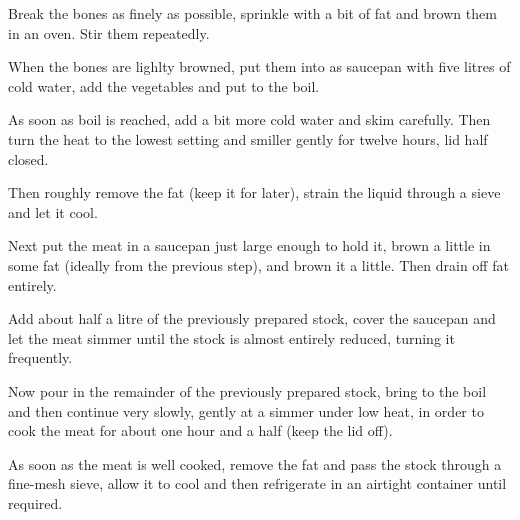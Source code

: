 \begin{method}
     	Break the bones as finely as possible, sprinkle with a bit of fat and brown them in an oven.  Stir them repeatedly.

	When the bones are lighlty browned, put them into as saucepan with five litres of cold water, add the vegetables and put to the boil.

	As soon as boil is reached, add a bit more cold water and skim carefully.  Then turn the heat to the lowest setting and smiller gently for twelve hours, lid half closed.

	Then roughly remove the fat (keep it for later), strain the liquid through a sieve and let it cool.

	Next put the meat in a saucepan just large enough to hold it, brown a little in some fat (ideally from the previous step), and brown it a little.  Then drain off fat entirely.

	Add about half a litre of the previously prepared stock, cover the saucepan and let the meat simmer until the stock is almost entirely reduced, turning it frequently.

	Now pour in the remainder of the previously prepared stock, bring to the boil and then continue very slowly, gently at a simmer under low heat, in order to cook the meat for about one hour and a half (keep the lid off). 

	 As soon as the meat is well cooked, remove the fat and pass the stock through a fine-mesh sieve, allow it to cool and then refrigerate in an airtight container until required.
\end {method}
